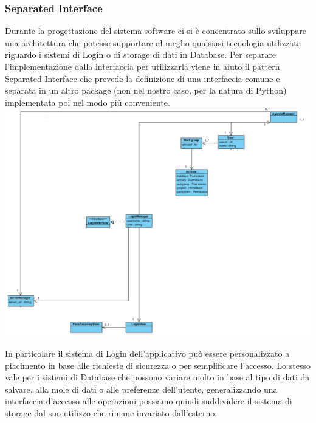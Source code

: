 \documentclass[12pt]{scrartcl}
\begin{document}
\subsubsection{Separated Interface}
Durante la progettazione del sistema software ci si \`e concentrato sullo sviluppare
una architettura che potesse supportare al meglio qualsiasi tecnologia utilizzata
riguardo i sistemi di Login o di storage di dati in Database.
Per separare l'implementazione dalla interfaccia per utilizzarla viene in aiuto
il pattern Separated Interface che prevede la definizione di una interfaccia
comune e separata in un altro package (non nel nostro caso, per la natura di Python)
implementata poi nel modo pi\`u conveniente.\\
    \includegraphics[scale=0.45]{4.png}

In particolare il sistema di Login dell'applicativo pu\`o essere personalizzato a
piacimento in base alle richieste di sicurezza o per semplificare l'accesso.
Lo stesso vale per i sistemi di Database che possono variare molto in base al tipo
di dati da salvare, alla mole di dati o alle preferenze dell'utente, generalizzando
una interfaccia d'accesso alle operazioni possiamo quindi suddividere il sistema
di storage dal suo utilizzo che rimane invariato dall'esterno.
\end{document}
